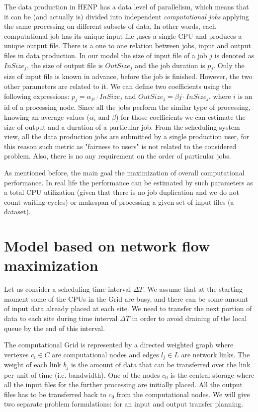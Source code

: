 \documentclass{svjour3}                     %
\begin{document}
The data production in HENP has a data level of parallelism, which means that it can be (and actually is) divided into independent \textit{computational jobs} applying the same processing on different subsets of data. In other words, each computational job has its unique input file ,uses a single CPU and produces a unique output file. There is a one to one relation between jobs, input and output files in data production. In our model the size of input file of a job $j$ is denoted as $InSize_{j}$, the size of output file is $OutSize_{j}$ and the job duration is $p_{j}$. Only the size of input file is known in advance, before the job is finished. However, the two other parameters are related to it. We can define two coefficients using the following expressions: $p_{j} = \alpha_{ji} \cdot InSize_{j}$ and $OutSize_{j} = \beta{j} \cdot InSize_{j}$, where $i$ is an id of a processing node. Since all the jobs perform the similar type of processing, knowing an average values ($\alpha_{i}$ and $\beta$) for those coefficients we can estimate the size of output and a duration of a particular job. From the scheduling system view, all the data production jobs are submitted by a single production user, for this reason such metric as "fairness to users" is not related to the considered problem. Also, there is no any requirement on the order of particular jobs. 


As mentioned before, the main goal the maximization of overall computational performance. In real life the performance can be estimated by such parameters as a total CPU utilization (given that there is no job duplication and we do not count waiting cycles) or makespan of processing a given set of input files (a dataset).

\section{Model based on network flow maximization}
\label{modeling}
Let us consider a scheduling time interval $\Delta T$. We assume that at the
starting moment some of the CPUs in the Grid are busy, and there can be some amount of
input data already placed at each site. We need to transfer the next portion
of data to each site during time interval $\Delta T$ in order to avoid
draining of the local queue by the end of this interval. 

The computational Grid is represented by a directed weighted graph where
vertexes $c_{i} \in C$ are computational nodes and edges $l_{j} \in L$ are
network links. The weight of each link $b_{j}$ is the amount of data that can be
transferred over the link per unit of time (i.e. bandwidth). One of the nodes
$c_{0}$ is the central storage where all the input files for the further
processing are initially placed. All the output files has to be transferred
back to $c_{0}$ from the computational nodes. We will give two separate
problem formulations: for an input and output transfer planning. 
\end{document}
